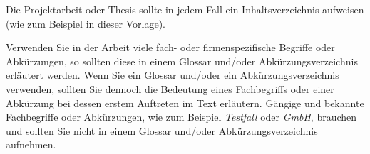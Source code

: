 Die Projektarbeit oder Thesis sollte in jedem Fall ein Inhaltsverzeichnis aufweisen (wie zum Beispiel in dieser Vorlage). 

Verwenden Sie in der Arbeit viele fach- oder firmenspezifische Begriffe oder Abkürzungen, so sollten diese in einem Glossar und/oder Abkürzungsverzeichnis erläutert werden. Wenn Sie ein Glossar und/oder ein Abkürzungsverzeichnis verwenden, sollten Sie dennoch die Bedeutung eines Fachbegriffs oder einer Abkürzung bei dessen erstem Auftreten im Text erläutern.  Gängige und bekannte Fachbegriffe oder Abkürzungen, wie zum Beispiel \textit{Testfall} oder \textit{GmbH}, brauchen und sollten Sie  nicht in einem Glossar und/oder Abkürzungsverzeichnis aufnehmen.